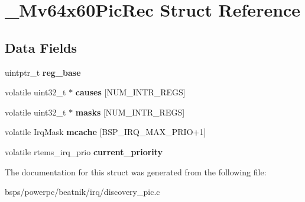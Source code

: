 \hypertarget{struct__Mv64x60PicRec}{}\section{\+\_\+\+Mv64x60\+Pic\+Rec Struct Reference}
\label{struct__Mv64x60PicRec}
\subsection*{Data Fields}
\begin{DoxyCompactItemize}
\item 
\mbox{\label{struct__Mv64x60PicRec_a9536c1833cb8b0077e85c7b0ddfca19b}} 
uintptr\+\_\+t {\bfseries reg\+\_\+base}
\item 
\mbox{\label{struct__Mv64x60PicRec_a832b6923d3b26fe04e39a7a516f35dea}} 
volatile uint32\+\_\+t $\ast$ {\bfseries causes} \mbox{[}N\+U\+M\+\_\+\+I\+N\+T\+R\+\_\+\+R\+E\+GS\mbox{]}
\item 
\mbox{\label{struct__Mv64x60PicRec_acc453541f164a10c2118fa390749eb4e}} 
volatile uint32\+\_\+t $\ast$ {\bfseries masks} \mbox{[}N\+U\+M\+\_\+\+I\+N\+T\+R\+\_\+\+R\+E\+GS\mbox{]}
\item 
\mbox{\label{struct__Mv64x60PicRec_aa1b49a0cbf6e04c1b6256649ce269a01}} 
volatile Irq\+Mask {\bfseries mcache} \mbox{[}B\+S\+P\+\_\+\+I\+R\+Q\+\_\+\+M\+A\+X\+\_\+\+P\+R\+IO+1\mbox{]}
\item 
\mbox{\label{struct__Mv64x60PicRec_ac8551384fedbf23e0d8bfa542f108560}} 
volatile rtems\+\_\+irq\+\_\+prio {\bfseries current\+\_\+priority}
\end{DoxyCompactItemize}


The documentation for this struct was generated from the following file\+:\begin{DoxyCompactItemize}
\item 
bsps/powerpc/beatnik/irq/discovery\+\_\+pic.\+c\end{DoxyCompactItemize}
